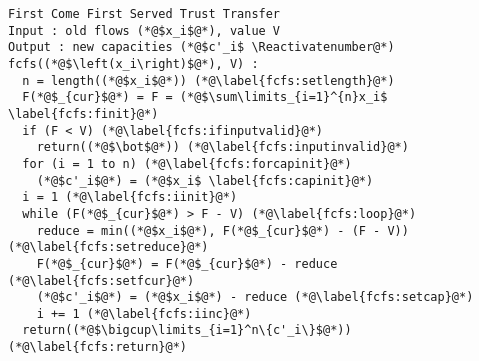 {}
\Suppressnumber
\begin{lstlisting}[label=fcfs, style=numbers]
First Come First Served Trust Transfer
Input : old flows (*@$x_i$@*), value V
Output : new capacities (*@$c'_i$ \Reactivatenumber@*)
fcfs((*@$\left(x_i\right)$@*), V) :
  n = length((*@$x_i$@*)) (*@\label{fcfs:setlength}@*)
  F(*@$_{cur}$@*) = F = (*@$\sum\limits_{i=1}^{n}x_i$ \label{fcfs:finit}@*)
  if (F < V) (*@\label{fcfs:ifinputvalid}@*)
    return((*@$\bot$@*)) (*@\label{fcfs:inputinvalid}@*)
  for (i = 1 to n) (*@\label{fcfs:forcapinit}@*)
    (*@$c'_i$@*) = (*@$x_i$ \label{fcfs:capinit}@*)
  i = 1 (*@\label{fcfs:iinit}@*)
  while (F(*@$_{cur}$@*) > F - V) (*@\label{fcfs:loop}@*)
    reduce = min((*@$x_i$@*), F(*@$_{cur}$@*) - (F - V)) (*@\label{fcfs:setreduce}@*)
    F(*@$_{cur}$@*) = F(*@$_{cur}$@*) - reduce (*@\label{fcfs:setfcur}@*)
    (*@$c'_i$@*) = (*@$x_i$@*) - reduce (*@\label{fcfs:setcap}@*)
    i += 1 (*@\label{fcfs:iinc}@*)
  return((*@$\bigcup\limits_{i=1}^n\{c'_i\}$@*)) (*@\label{fcfs:return}@*)
\end{lstlisting}
